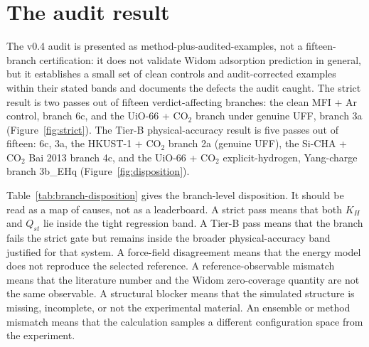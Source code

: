 \section{The audit result}\label{sec:result}

The v0.4 audit is presented as method-plus-audited-examples, not a fifteen-branch certification: it does not validate Widom adsorption prediction in general, but it establishes a small set of clean controls and audit-corrected examples within their stated bands and documents the defects the audit caught. The strict result is two passes out of fifteen verdict-affecting branches: the clean MFI + Ar control, branch 6c, and the UiO-66 + CO\(_2\) branch under genuine UFF, branch 3a (Figure~\ref{fig:strict}). The Tier-B physical-accuracy result is five passes out of fifteen: 6c, 3a, the HKUST-1 + CO\(_2\) branch 2a (genuine UFF), the Si-CHA + CO\(_2\) Bai 2013 branch 4c, and the UiO-66 + CO\(_2\) explicit-hydrogen, Yang-charge branch 3b\_EHq (Figure~\ref{fig:disposition}).

Table~\ref{tab:branch-disposition} gives the branch-level disposition. It should be read as a map of causes, not as a leaderboard. A strict pass means that both \(K_H\) and \(Q_{st}\) lie inside the tight regression band. A Tier-B pass means that the branch fails the strict gate but remains inside the broader physical-accuracy band justified for that system. A force-field disagreement means that the energy model does not reproduce the selected reference. A reference-observable mismatch means that the literature number and the Widom zero-coverage quantity are not the same observable. A structural blocker means that the simulated structure is missing, incomplete, or not the experimental material. An ensemble or method mismatch means that the calculation samples a different configuration space from the experiment.



